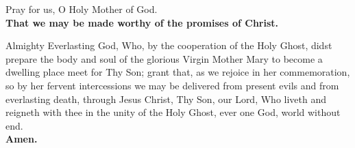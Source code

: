Pray for us, O Holy Mother of God.\\
\textbf{That we may be made worthy of the promises of Christ.}

Almighty Everlasting God, Who, by the cooperation of the Holy Ghost, didst prepare the body and soul of the
glorious Virgin Mother Mary to become a dwelling place meet for Thy Son;
grant that, as we rejoice in her commemoration, so by her fervent intercessions we may be delivered from present evils and from everlasting death,
through Jesus Christ, Thy Son, our Lord, Who liveth and reigneth with thee in the unity of the Holy Ghost, ever one God, world without end.\\
\textbf{Amen.}

\clearpage
